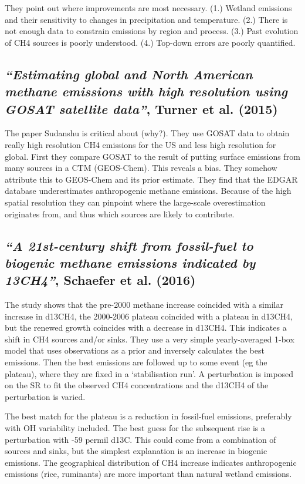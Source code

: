 \documentclass{article}
\begin{document}
They point out where improvements are most necessary. (1.) Wetland emissions and their sensitivity to changes in precipitation and temperature. (2.) There is not enough data to constrain emissions by region and process. (3.) Past evolution of CH4 sources is poorly understood. (4.) Top-down errors are poorly quantified.

\subsection{\textit{“Estimating global and North American methane emissions with high resolution using GOSAT satellite data”}, Turner et al. (2015)}
The paper Sudanshu is critical about (why?). They use GOSAT data to obtain really high resolution CH4 emissions for the US and less high resolution for global. First they compare GOSAT to the result of putting surface emissions from many sources in a CTM (GEOS-Chem). This reveals a bias. They somehow attribute this to GEOS-Chem and its prior estimate. They find that the EDGAR database underestimates anthropogenic methane emissions. Because of the high spatial resolution they can pinpoint where the large-scale overestimation originates from, and thus which sources are likely to contribute.

\subsection{\textit{“A 21st-century shift from fossil-fuel to biogenic methane emissions indicated by 13CH4”}, Schaefer et al. (2016)}
The study shows that the pre-2000 methane increase coincided with a similar increase in d13CH4, the 2000-2006 plateau coincided with a plateau in d13CH4, but the renewed growth coincides with a decrease in d13CH4. This indicates a shift in CH4 sources and/or sinks. They use a very simple yearly-averaged 1-box model that uses observations as a prior and inversely calculates the best emissions. Then the best emissions are followed up to some event (eg the plateau), where they are fixed in a ‘stabilisation run’. A perturbation is imposed on the SR to fit the observed CH4 concentrations and the d13CH4 of the perturbation is varied.

The best match for the plateau is a reduction in fossil-fuel emissions, preferably with OH variability included. The best guess for the subsequent rise is a perturbation with -59 permil d13C. This could come from a combination of sources and sinks, but the simplest explanation is an increase in biogenic emissions. The geographical distribution of CH4 increase indicates anthropogenic emissions (rice, ruminants) are more important than natural wetland emissions.
\end{document}
